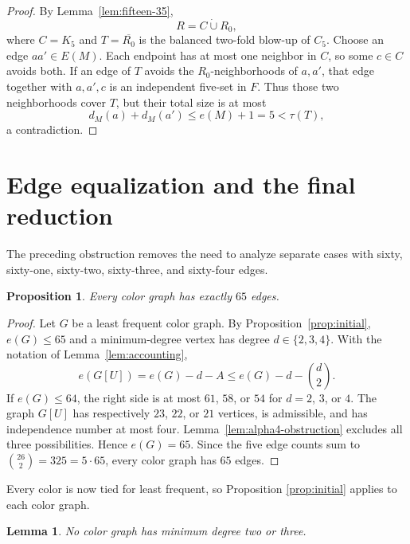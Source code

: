 \documentclass[11pt,reqno,a4paper]{amsart}
\newtheorem{proposition}[theorem]{Proposition}
\newtheorem{lemma}[theorem]{Lemma}
\theoremstyle{definition}
\theoremstyle{remark}
\newcommand{\comp}[1]{\overline{#1}}
\begin{document}
\begin{proof}
By Lemma~\ref{lem:fifteen-35},
\[
  R=C\mathbin{\dot\cup}R_0,
\]
where $C=K_5$ and $T=\comp{R_0}$ is the balanced two-fold blow-up of $C_5$.
Choose an edge $aa'\in E(M)$.  Each endpoint has at most one neighbor in
$C$, so some $c\in C$ avoids both.  If an edge of $T$ avoids the
$R_0$-neighborhoods of $a,a'$, that edge together with $a,a',c$ is an
independent five-set in $F$.  Thus those two neighborhoods cover $T$, but
their total size is at most
\[
  d_M(a)+d_M(a')\leq e(M)+1=5<\tau(T),
\]
a contradiction.
\end{proof}

\section{Edge equalization and the final reduction}\label{sec:equalization}

The preceding obstruction removes the need to analyze separate cases with
sixty, sixty-one, sixty-two, sixty-three, and sixty-four edges.

\begin{proposition}\label{prop:equalization}
Every color graph has exactly $65$ edges.
\end{proposition}

\begin{proof}
Let $G$ be a least frequent color graph.  By
Proposition~\ref{prop:initial}, $e(G)\leq65$ and a minimum-degree vertex has
degree $d\in\{2,3,4\}$.  With the notation of
Lemma~\ref{lem:accounting},
\begin{equation}\label{eq:nonneighbor-upper}
  e(G[U])=e(G)-d-A
  \leq e(G)-d-\binom d2.
\end{equation}
If $e(G)\leq64$, the right side is at most $61$, $58$, or $54$ for
$d=2$, $3$, or $4$.  The graph $G[U]$ has respectively $23$, $22$, or
$21$ vertices, is admissible, and has independence number at most four.
Lemma~\ref{lem:alpha4-obstruction} excludes all three possibilities.  Hence
$e(G)=65$.  Since the five edge counts sum to
$\binom{26}{2}=325=5\cdot65$, every color graph has $65$ edges.
\end{proof}

Every color is now tied for least frequent, so Proposition
\ref{prop:initial} applies to each color graph.

\begin{lemma}\label{lem:no-degree-two-three}
No color graph has minimum degree two or three.
\end{lemma}
\end{document}
